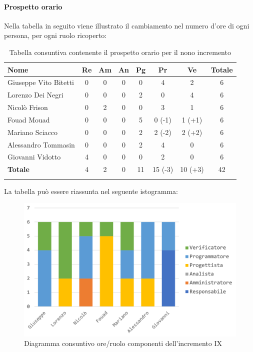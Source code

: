		\paragraph{Prospetto orario}
			Nella tabella in seguito viene illustrato il cambiamento nel numero d'ore di ogni persona, per ogni ruolo ricoperto:
		
		\begin{longtable}{|l|c|c|c|c|c|c|c|}
			\hline
			\rowcolor{lighter-grayer}
			\textbf{Nome} & \textbf{Re} & \textbf{Am} & \textbf{An} & \textbf{Pg}  & \textbf{Pr}   & \textbf{Ve} & \textbf{Totale} \\
			\hline
			\endfirsthead
			
			\hline
			Giuseppe Vito Bitetti 		 & 0 & 0 & 0 & 0 & 4 & 2 & 6\\
			\hline
			\hline
			Lorenzo Dei Negri			 & 0 & 0 & 0 & 2 & 0 & 4 & 6\\
			\hline
			\hline
			Nicolò Frison				      & 0 & 2 & 0 & 0 & 3 & 1 & 6\\
			\hline
			\hline
			Fouad Mouad 				   & 0 & 0 & 0 & 5 & 0 (-1) & 1 (+1) & 6\\
			\hline
			\hline
			Mariano Sciacco 			 & 0 & 0 & 0 & 2 & 2 (-2) & 2 (+2) & 6\\
			\hline
			\hline
			Alessandro Tommasin    & 0 & 0 & 0 & 2 & 4 & 0 & 6\\
			\hline
			\hline
			Giovanni Vidotto 			  & 4 & 0 & 0 & 0 & 2 & 0 & 6\\
			\hline 
			\textbf{Totale}			 		& 4 & 2 & 0 & 11 & 15 (-3) & 10 (+3) & 42\\
			\hline
			\caption{Tabella consuntiva contenente il prospetto orario per il nono incremento}
		\end{longtable}
		\pagebreak
		
		La tabella può essere riassunta nel seguente istogramma:
		
		\begin{figure}[H]
			\centering
			\includegraphics[width=0.8\linewidth]{images/consuntivo/ConsIncr9-1.png}
			\caption{Diagramma consuntivo ore/ruolo componenti dell'incremento IX}
			\label{fig:consuntivo diagramma suddivisione ruoli incremento IX}
		\end{figure}
		
